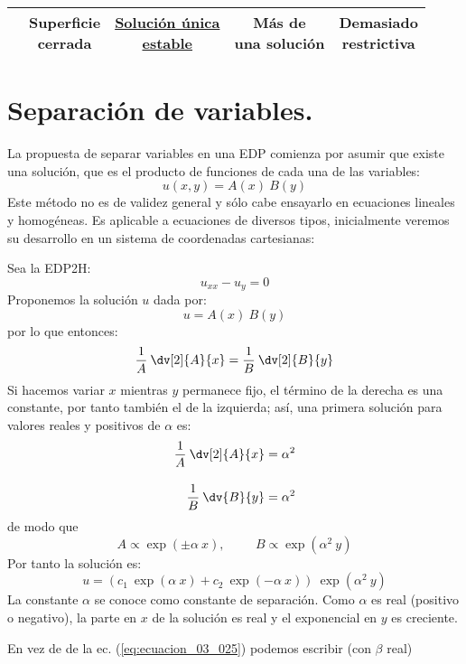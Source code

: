 \begin{landscape}
\begin{center}
\begin{tabular}{ | c | c | c | c | c |}
& \makecell{Superficie \\ cerrada} & \makecell{\underline{\textbf{Solución única}} \\ \underline{\textbf{estable}}} & \makecell{Más de \\ una solución} & \makecell{Demasiado \\ restrictiva} \\ \hline
\end{tabular}
\end{center}
\end{landscape}
\section{Separación de variables.}
La propuesta de separar variables en una EDP comienza por asumir que existe una solución, que es el producto de funciones de cada una de las variables:
\[ u(x, y) = A(x) \: B(y) \]
Este método no es de validez general y sólo cabe ensayarlo en ecuaciones lineales y homogéneas. Es aplicable a ecuaciones de diversos tipos, inicialmente veremos su desarrollo en un sistema de coordenadas cartesianas:
\par
Sea la EDP2H:
\[ u_{xx} - u_{y} = 0 \]
Proponemos la solución $u$ dada por:
\[ u = A(x) \: B(y) \]
por lo que entonces:
\[ \dfrac{1}{A} \: \dv[2]{A}{x} = \dfrac{1}{B} \: \dv[2]{B}{y} \]
Si hacemos variar $x$ mientras $y$ permanece fijo, el término de la derecha es una constante, por tanto también el de la izquierda; así, una primera solución para valores reales y positivos de $\alpha$ es:
\begin{align}
\begin{aligned}
\dfrac{1}{A} \: \dv[2]{A}{x} = \alpha^{2} \\[1em]
\dfrac{1}{B} \: \dv{B}{y} = \alpha^{2}
\end{aligned}
\label{eq:ecuacion_03_025}
\end{align}
de modo que
\[ A \propto  \exp(\pm \alpha \: x), \hspace{1cm} B \propto \exp(\alpha^{2} \: y) \]
Por tanto la solución es:
\begin{equation}
u = \left( c_{1} \: \exp(\alpha \: x) + c_{2} \: \exp(-\alpha \: x) \right) \: \exp(\alpha^{2} \: y)
\label{eq:ecuacion_03_026}
 \end{equation}
La constante $\alpha$ se conoce como constante de separación. Como $\alpha$ es real (positivo o negativo), la parte en $x$ de la solución es real y el exponencial en $y$ es creciente.
\par
En vez de de la ec. (\ref{eq:ecuacion_03_025}) podemos escribir (con $\beta$ real)
